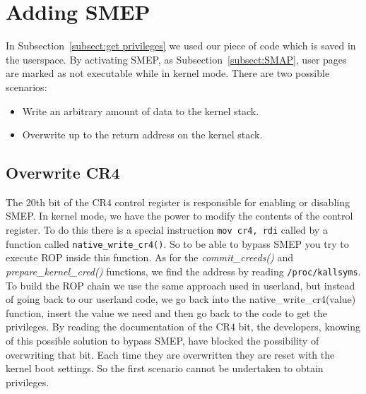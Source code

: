 \documentclass{masterthesis}
\newcommand{\refToSubSection}[1]{Subsection~\ref{subsect:#1}\xspace}
\begin{document}
\section{Adding SMEP}
In \refToSubSection{get privileges} we used our piece of code which is saved in the userspace. By activating SMEP, as \refToSubSection{SMAP}, user pages are marked as not executable while in kernel mode.
There are two possible scenarios:
\begin{itemize}
\item Write an arbitrary amount of data to the kernel stack.
\item Overwrite up to the return address on the kernel stack.
\end{itemize}
\subsection{Overwrite CR4}
\label{subsect:CR4}
The 20th bit of the CR4 control register is responsible for enabling or disabling SMEP.
In kernel mode, we have the power to modify the contents of the control register.
To do this there is a special instruction \lstinline{mov cr4, rdi} called by a function called \texttt{native\_write\_cr4()}.
So to be able to bypass SMEP you try to execute ROP inside this function.
As for the \emph{commit\_creeds()} and \emph{prepare\_kernel\_cred()} functions, we find the address by reading \lstinline{/proc/kallsyms}.
To build the ROP chain we use the same approach used in userland, but instead of going back to our userland code, we go back into the native\_write\_cr4(value) function, insert the value we need and then go back to the code to get the privileges.
By reading the documentation of the CR4 bit, the developers, knowing of this possible solution to bypass SMEP, have blocked the possibility of overwriting that bit.
Each time they are overwritten they are reset with the kernel boot settings.
So the first scenario cannot be undertaken to obtain privileges.
\end{document}
